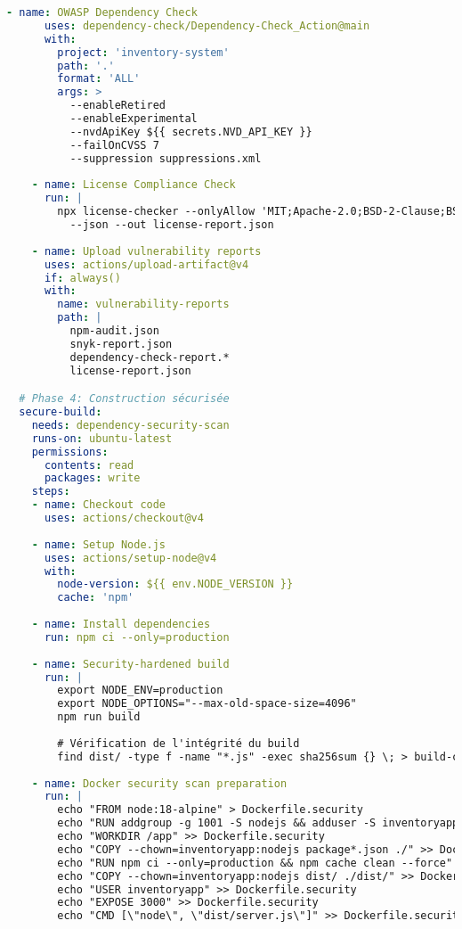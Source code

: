 \documentclass[12pt,a4paper]{report}
\begin{document}
\begin{lstlisting}[language=YAML, caption=Pipeline GitHub Actions DevSecOps complète]
    - name: OWASP Dependency Check
      uses: dependency-check/Dependency-Check_Action@main
      with:
        project: 'inventory-system'
        path: '.'
        format: 'ALL'
        args: >
          --enableRetired
          --enableExperimental
          --nvdApiKey ${{ secrets.NVD_API_KEY }}
          --failOnCVSS 7
          --suppression suppressions.xml
    
    - name: License Compliance Check
      run: |
        npx license-checker --onlyAllow 'MIT;Apache-2.0;BSD-2-Clause;BSD-3-Clause;ISC' \
          --json --out license-report.json
    
    - name: Upload vulnerability reports
      uses: actions/upload-artifact@v4
      if: always()
      with:
        name: vulnerability-reports
        path: |
          npm-audit.json
          snyk-report.json
          dependency-check-report.*
          license-report.json

  # Phase 4: Construction sécurisée
  secure-build:
    needs: dependency-security-scan
    runs-on: ubuntu-latest
    permissions:
      contents: read
      packages: write
    steps:
    - name: Checkout code
      uses: actions/checkout@v4
    
    - name: Setup Node.js
      uses: actions/setup-node@v4
      with:
        node-version: ${{ env.NODE_VERSION }}
        cache: 'npm'
    
    - name: Install dependencies
      run: npm ci --only=production
    
    - name: Security-hardened build
      run: |
        export NODE_ENV=production
        export NODE_OPTIONS="--max-old-space-size=4096"
        npm run build
        
        # Vérification de l'intégrité du build
        find dist/ -type f -name "*.js" -exec sha256sum {} \; > build-checksums.txt
    
    - name: Docker security scan preparation
      run: |
        echo "FROM node:18-alpine" > Dockerfile.security
        echo "RUN addgroup -g 1001 -S nodejs && adduser -S inventoryapp -u 1001" >> Dockerfile.security
        echo "WORKDIR /app" >> Dockerfile.security
        echo "COPY --chown=inventoryapp:nodejs package*.json ./" >> Dockerfile.security
        echo "RUN npm ci --only=production && npm cache clean --force" >> Dockerfile.security
        echo "COPY --chown=inventoryapp:nodejs dist/ ./dist/" >> Dockerfile.security
        echo "USER inventoryapp" >> Dockerfile.security
        echo "EXPOSE 3000" >> Dockerfile.security
        echo "CMD [\"node\", \"dist/server.js\"]" >> Dockerfile.security
    

\end{lstlisting}
\end{document}
